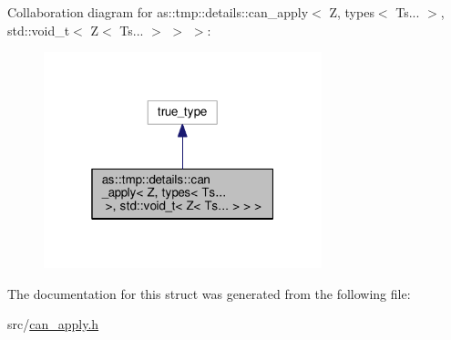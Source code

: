 Collaboration diagram for as\+:\+:tmp\+:\+:details\+:\+:can\+\_\+apply$<$ Z, types$<$ Ts... $>$, std\+:\+:void\+\_\+t$<$ Z$<$ Ts... $>$ $>$ $>$\+:
\nopagebreak
\begin{figure}[H]
\begin{center}
\leavevmode
\includegraphics[width=229pt]{structas_1_1tmp_1_1details_1_1can__apply_3_01Z_00_01types_3_01Ts_8_8_8_01_4_00_01std_1_1void__t_5dee29e932352e51efcbc7ee5aec093f}
\end{center}
\end{figure}


The documentation for this struct was generated from the following file\+:\begin{DoxyCompactItemize}
\item 
src/\hyperlink{can__apply_8h}{can\+\_\+apply.\+h}\end{DoxyCompactItemize}
